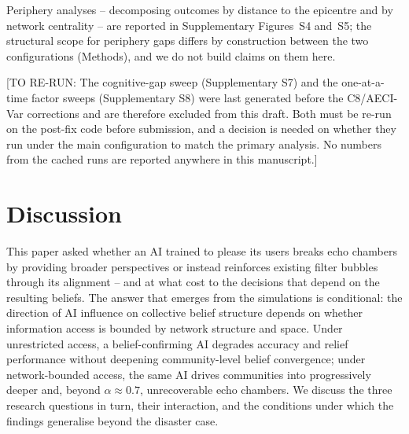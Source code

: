 \documentclass[pdflatex,sn-basic]{sn-jnl}
\begin{document}
Periphery analyses -- decomposing outcomes by distance to the epicentre and by network centrality -- are reported in Supplementary Figures~S4 and~S5; the structural scope for periphery gaps differs by construction between the two configurations (Methods), and we do not build claims on them here.

[TO RE-RUN: The cognitive-gap sweep (Supplementary S7) and the one-at-a-time factor sweeps (Supplementary S8) were last generated before the C8/AECI-Var corrections and are therefore excluded from this draft. Both must be re-run on the post-fix code before submission, and a decision is needed on whether they run under the main configuration to match the primary analysis. No numbers from the cached runs are reported anywhere in this manuscript.]

\section{Discussion}\label{sec:discussion}

This paper asked whether an AI trained to please its users breaks echo chambers by providing broader perspectives or instead reinforces existing filter bubbles through its alignment -- and at what cost to the decisions that depend on the resulting beliefs. The answer that emerges from the simulations is conditional: the direction of AI influence on collective belief structure depends on whether information access is bounded by network structure and space. Under unrestricted access, a belief-confirming AI degrades accuracy and relief performance without deepening community-level belief convergence; under network-bounded access, the same AI drives communities into progressively deeper and, beyond $\alpha \approx 0.7$, unrecoverable echo chambers. We discuss the three research questions in turn, their interaction, and the conditions under which the findings generalise beyond the disaster case.
\end{document}
